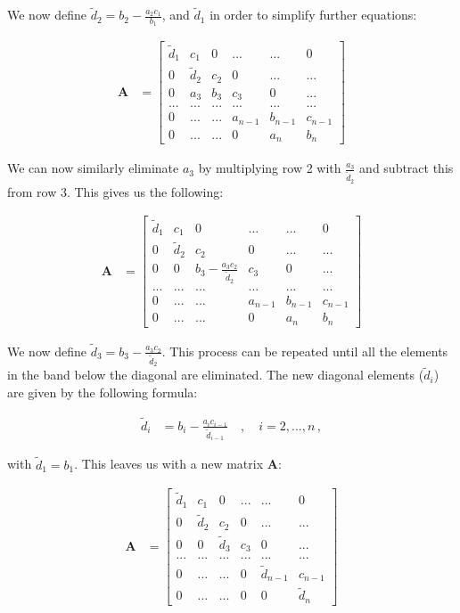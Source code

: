 \documentclass[english,notitlepage,reprint]{revtex4-1}  %
\begin{document}
We now define $\tilde{d}_2 = b_2 - \frac{a_2c_1}{b_1}$, and $\tilde{d}_1$ in order to simplify further equations:

\begin{align*}
\textbf{A} &= \begin{bmatrix}
\tilde{d}_1 & c_1 & 0 & ... & ... & 0 \\
0 & \tilde{d}_2 & c_2 & 0 & ... & ... \\
0 & a_3 & b_3 & c_3 & 0 & ... \\
... & ... & ... & ... & ... & ... \\
0 & ... & ... & a_{n-1} & b_{n-1} & c_{n-1} \\
0 & ... & ... & 0 & a_{n} & b_n 
\end{bmatrix}
\end{align*}

We can now similarly eliminate $a_3$ by multiplying row 2 with $\frac{a_3}{\tilde{d}_2}$ and subtract this from row 3. This gives us the following:

\begin{align*}
\textbf{A} &= \begin{bmatrix}
\tilde{d}_1 & c_1 & 0 & ... & ... & 0 \\
0 & \tilde{d}_2 & c_2 & 0 & ... & ... \\
0 & 0 & b_3 - \frac{a_3 c_2}{\tilde{d}_2} & c_3 & 0 & ... \\
... & ... & ... & ... & ... & ... \\
0 & ... & ... & a_{n-1} & b_{n-1} & c_{n-1} \\
0 & ... & ... & 0 & a_{n} & b_n 
\end{bmatrix}
\end{align*}

We now define $\tilde{d}_3 = b_3 - \frac{a_3c_2}{\tilde{d}_2}$. This process can be repeated until all the elements in the band below the diagonal are eliminated. The new diagonal elements ($\tilde{d}_i$) are given by the following formula:

\begin{align*}
\tilde{d}_i &= b_i - \frac{a_i c_{i-1}}{\tilde{d}_{i-1}} \quad , \quad i = 2,...,n \, ,
\end{align*}

with $\tilde{d}_1 = b_1$. This leaves us with a new matrix \textbf{A}:

\begin{align*}
\textbf{A} &= \begin{bmatrix}
\tilde{d}_1 & c_1 & 0 & ... & ... & 0 \\
0 & \tilde{d}_2 & c_2 & 0 & ... & ... \\
0 & 0 & \tilde{d}_3 & c_3 & 0 & ... \\
... & ... & ... & ... & ... & ... \\
0 & ... & ... & 0 & \tilde{d}_{n-1} & c_{n-1} \\
0 & ... & ... & 0 & 0 & \tilde{d}_n 
\end{bmatrix}
\end{align*}
\end{document}

